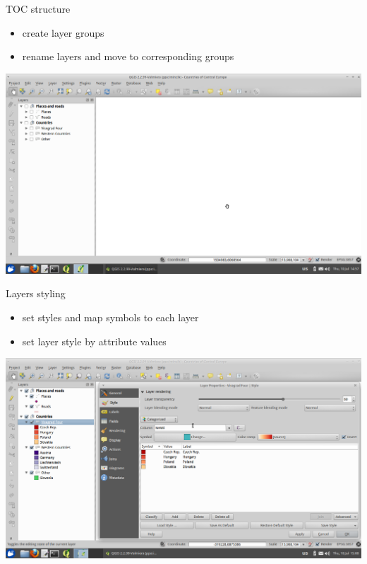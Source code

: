 \documentclass[12pt]{beamer}
\begin{document}
\begin{frame}{TOC structure}
	\begin{itemize}
		\item create layer groups
		\item rename layers and move to corresponding groups
	\end{itemize}
	\begin{center}
		\includegraphics[keepaspectratio=true,height=0.6\textheight]{images/rapid-gis-deployment/project-create-toc-structure.png}
	\end{center}
\end{frame}


\begin{frame}{Layers styling}
	\begin{itemize}
		\item set styles and map symbols to each layer
		\item set layer style by attribute values
	\end{itemize}
	\begin{center}
		\includegraphics[keepaspectratio=true,height=0.6\textheight]{images/rapid-gis-deployment/project-layer-style.png}
	\end{center}
\end{frame}
\end{document}
